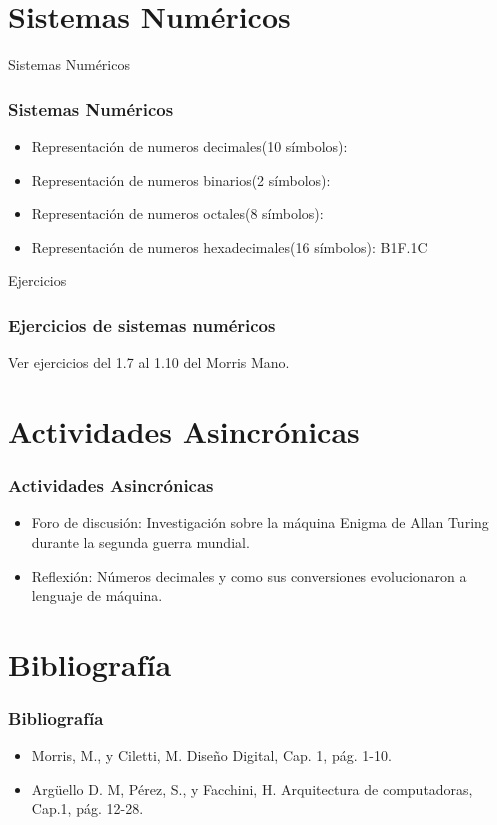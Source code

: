 \documentclass[11pt]{beamer}
\begin{document}
\section{Sistemas Num\'ericos}
\begin{frame}{Sistemas Num\'ericos}
\frametitle{Sistemas Num\'ericos}
	\begin{itemize}
		\item Representaci\'on de numeros decimales(10 s\'imbolos):\linebreak
			\linebreak
			\linebreak
		\item 
			Representaci\'on de numeros binarios(2 s\'imbolos):
		\item 
			Representaci\'on de numeros octales(8 s\'imbolos):
		\item 
			Representaci\'on de numeros hexadecimales(16 s\'imbolos):\linebreak
			B1F.1C
	\end{itemize}
\end{frame}

\begin{frame}{Ejercicios}
\frametitle{Ejercicios de sistemas num\'ericos}
Ver ejercicios del 1.7 al 1.10 del Morris Mano.
\end{frame}


\section{Actividades Asincr\'onicas}
\begin{frame}
\frametitle{Actividades Asincr\'onicas}
	\begin{itemize}
		\item Foro de discusión: Investigación sobre la m\'aquina Enigma de Allan Turing durante la segunda guerra mundial.
		\item Reflexi\'on: N\'umeros decimales y como sus conversiones evolucionaron a lenguaje de m\'aquina.
		\end{itemize}
\end{frame}

\section{Bibliograf\'ia}
\begin{frame}
	\frametitle{Bibliograf\'ia}
	\begin{itemize}
		\item Morris, M., y Ciletti, M. Diseño Digital, Cap. 1, pág. 1-10.
		\item Argüello D. M, Pérez, S., y Facchini, H. Arquitectura de computadoras, Cap.1, pág. 12-28.
		\end{itemize}
\end{frame}
\end{document}
